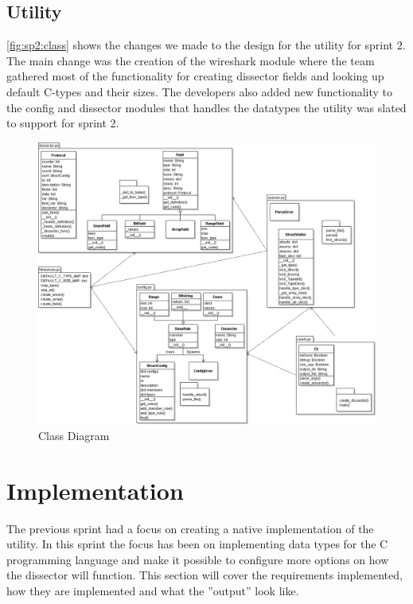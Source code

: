 \subsection{Utility}
\autoref{fig:sp2:class} shows the changes we made to the design for the utility for sprint 2. The main change was the creation of the wireshark module where the team gathered most of the functionality for creating dissector fields and looking up default C-types and their sizes. The developers also added new functionality to the config and dissector modules that handles the datatypes the utility was slated to support for sprint 2.
\begin{figure}[!htb]
	\center
	\includegraphics[width=\textwidth]{./sprints/img/class_diagram_s2}
	\caption{Class Diagram\label{fig:sp2:class}}
\end{figure}



\section{Implementation}

The previous sprint had a focus on creating a native implementation of the 
utility. In this sprint the focus has been on implementing data types for the 
C programming language and make it possible to configure more options on how 
the dissector will function. This section will cover the requirements 
implemented, how they are implemented and what the ''output'' look like.

